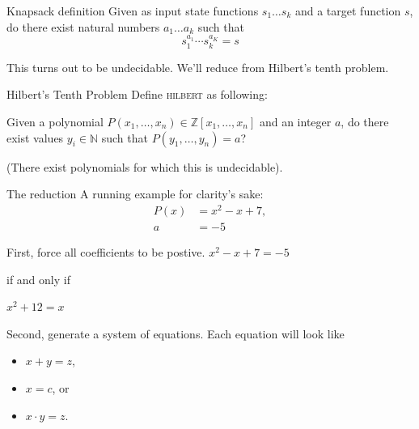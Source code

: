 \documentclass{beamer}
\begin{document}
\begin{frame}{Knapsack definition}
  Given as input state functions $s_1 \ldots s_k$ and a target
  function $s$, do there exist natural numbers $a_1\ldots a_k$ such
  that
  \[ s_1^{a_1} \cdots s_k^{a_K} = s \]
\end{frame}

\begin{frame}
  This turns out to be undecidable. We'll reduce from Hilbert's tenth
  problem.
\end{frame}

\begin{frame}{Hilbert's Tenth Problem}
  Define \textsc{hilbert} as following:

  Given a polynomial
  $P(x_1, \ldots, x_n) \in \mathbb{Z}[x_1, \ldots, x_n]$ and an
  integer $a$, do there exist values $y_i \in \mathbb{N}$ such that
  $P(y_1, \ldots, y_n) = a$?

  (There exist polynomials for which this is undecidable).
\end{frame}

\begin{frame}{The reduction}
  A running example for clarity's sake:
  \begin{align*}
    P(x) &= x^2 - x + 7, \\
    a &= -5
  \end{align*}
\end{frame}


\begin{frame}{First, force all coefficients to be postive.}
  $x^2 - x + 7 = -5$

  if and only if

  $x^2 + 12 = x$
\end{frame}

\begin{frame}{Second, generate a system of equations.}
  Each equation will look like
  \begin{itemize}
  \item $x + y = z$,
  \item $x = c$, or 
  \item $x\cdot y = z$.
  \end{itemize}
\end{frame}
\end{document}
